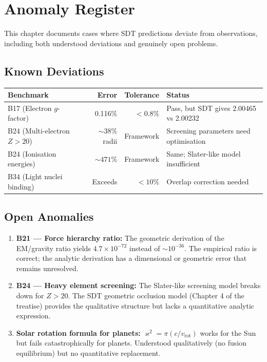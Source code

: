 \documentclass[12pt,a4paper]{report}
\newcommand{\kop}{\varkappa}
\begin{document}
\chapter{Anomaly Register}
\label{ch:anomalies}

This chapter documents cases where SDT predictions deviate from observations, including both understood deviations and genuinely open problems.

\section{Known Deviations}

\begin{center}
\begin{tabular}{lrrl}
\toprule
\textbf{Benchmark} & \textbf{Error} & \textbf{Tolerance} & \textbf{Status} \\
\midrule
B17 (Electron $g$-factor) & 0.116\% & $<0.8\%$ & Pass, but SDT gives 2.00465 vs 2.00232 \\
B24 (Multi-electron $Z > 20$) & $\sim 38\%$ radii & Framework & Screening parameters need optimisation \\
B24 (Ionisation energies) & $\sim 471\%$ & Framework & Same; Slater-like model insufficient \\
B34 (Light nuclei binding) & Exceeds & $<10\%$ & Overlap correction needed \\
\bottomrule
\end{tabular}
\end{center}

\section{Open Anomalies}

\begin{enumerate}
  \item \textbf{B21 --- Force hierarchy ratio:} The geometric derivation of the EM/gravity ratio yields $4.7 \times 10^{-72}$ instead of $\sim 10^{-36}$. The empirical ratio is correct; the analytic derivation has a dimensional or geometric error that remains unresolved.
  \item \textbf{B24 --- Heavy element screening:} The Slater-like screening model breaks down for $Z > 20$. The SDT geometric occlusion model (Chapter 4 of the treatise) provides the qualitative structure but lacks a quantitative analytic expression.
  \item \textbf{Solar rotation formula for planets:} $\kop^2 = \pi(c/v_{\text{rot}})$ works for the Sun but fails catastrophically for planets. Understood qualitatively (no fusion equilibrium) but no quantitative replacement.
\end{enumerate}
\end{document}

